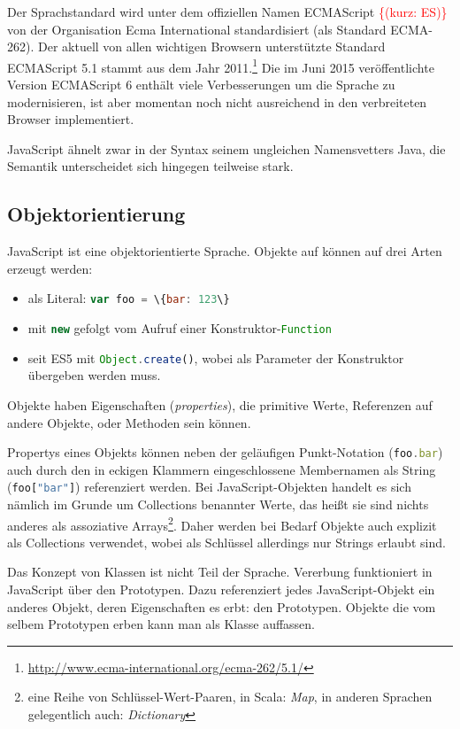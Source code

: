 \documentclass[a4paper, 12pt, hidelinks, listof=totoc, listoftables=totoc, bibliography=totoc]{scrreprt}
\newcommand{\code}[1]{\lstinline[language=Scala, style=inline]|#1|}
\newcommand{\js}[1]{\lstinline[language=JavaScript, style=inline]|#1|}
\newcommand{\TODOi}[1]{\textcolor{red}{\{#1\}}}
\begin{document}
Der Sprachstandard wird unter dem offiziellen Namen ECMAScript \TODOi{(kurz: ES)} von der Organisation Ecma International standardisiert (als Standard ECMA-262). Der aktuell von allen wichtigen Browsern unterstützte Standard ECMAScript 5.1 stammt aus dem Jahr 2011.\footnote{\url{http://www.ecma-international.org/ecma-262/5.1/}} Die im Juni 2015 veröffentlichte Version ECMAScript 6 enthält viele Verbesserungen um die Sprache zu modernisieren, ist aber momentan noch nicht ausreichend in den verbreiteten Browser implementiert.

JavaScript ähnelt zwar in der Syntax seinem ungleichen Namensvetters Java, die Semantik unterscheidet sich hingegen teilweise stark\cite{eich1996.JSL}.


\subsection{Objektorientierung}

JavaScript ist eine objektorientierte Sprache. Objekte auf können auf drei Arten erzeugt werden:

\begin{itemize}
  \item als Literal: \js{var foo = \{bar: 123\}}
  \item mit \js{new} gefolgt vom Aufruf einer Konstruktor-\code{Function}
  \item seit ES5 mit \js{Object.create()}, wobei als Parameter der Konstruktor übergeben werden muss.
\end{itemize}

Objekte haben Eigenschaften (\textit{properties}), die primitive Werte, Referenzen auf andere Objekte, oder Methoden sein können.

Propertys eines Objekts können neben der geläufigen Punkt-Notation (\js{foo.bar}) auch durch den in eckigen Klammern eingeschlossene Membernamen als String \mbox{(\js{foo["bar"]})} referenziert werden. Bei JavaScript-Objekten handelt es sich nämlich im Grunde um Collections benannter Werte, das heißt sie sind nichts anderes als assoziative Arrays\footnote{eine Reihe von Schlüssel-Wert-Paaren, in Scala: \textit{Map}, in anderen Sprachen gelegentlich auch: \textit{Dictionary}}. Daher werden bei Bedarf Objekte auch explizit als Collections verwendet, wobei als Schlüssel allerdings nur Strings erlaubt sind.

Das Konzept von Klassen ist nicht Teil der Sprache. Vererbung funktioniert in JavaScript über den Prototypen. Dazu referenziert jedes JavaScript-Objekt ein anderes Objekt, deren Eigenschaften es erbt: den Prototypen. Objekte die vom selbem Prototypen erben kann man als Klasse auffassen.\cite{mdn.WWO}\cite[S. 115 ff., S. 199 ff.]{flanagan2011.JDG}
\end{document}
